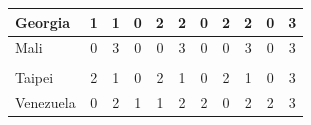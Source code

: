 \documentclass[12pt]{article}  %
\begin{document}
\begin{subappendices}
\begin{longtable}{|l|c|c|c|c|c|c|c|c|c|c|}
	\hline
	Georgia                                                        & 1                                                                      & 1                                                                      & 0                                                                      & 2                                                                      & 2                                                                      & 0                                                                      & 2                         & 2                           & 0                           & 3                           \\ 
	\hline
	Mali                                                           & 0                                                                      & 3                                                                      & 0                                                                      & 0                                                                      & 3                                                                      & 0                                                                      & 0                         & 3                           & 0                           & 3                           \\ 
	\hline
	\begin{tabular}[c]{@{}l@{}}Chinese\\Taipei\end{tabular}        & 2                                                                      & 1                                                                      & 0                                                                      & 2                                                                      & 1                                                                      & 0                                                                      & 2                         & 1                           & 0                           & 3                           \\ 
	\hline
	Venezuela                                                      & 0                                                                      & 2                                                                      & 1                                                                      & 1                                                                      & 2                                                                      & 2                                                                      & 0                         & 2                           & 2                           & 3                           \\ 

\end{longtable}
\end{subappendices}
\end{document}
